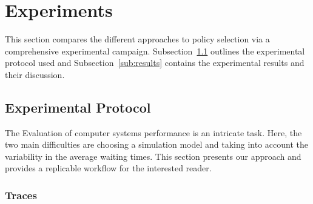 \documentclass[sigconf,review]{acmart}
\begin{document}

\section{Experiments}
\label{sec:experiments}

This section compares the different approaches to policy selection via a
comprehensive experimental campaign.  Subsection~\ref{sub:protocol} outlines
the experimental protocol used and Subsection~\ref{sub:results} contains the
experimental results and their discussion.

\subsection{Experimental Protocol}
\label{sub:protocol}

The Evaluation of computer systems performance is an intricate
task\cite{feitbook}. Here, the two main difficulties are choosing a simulation
model and taking into account the variability in the average waiting times.
This section presents our approach and provides a replicable workflow
for the interested reader.

\subsubsection{Traces}
\label{sub:traces}
\end{document}
